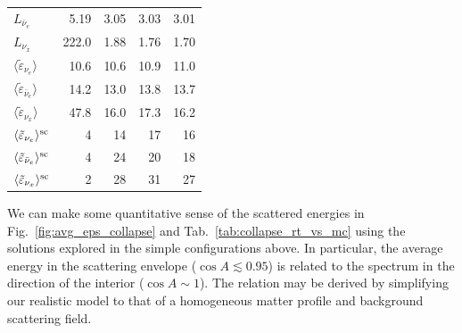 \documentclass[aps,floatfix,prd,superscriptaddress,twocolumn]{revtex4-1}
\begin{document}
\begin{table}
\begin{tabularx}{\columnwidth}{X r r r r}
    $L_{\bar{\nu}_e}$                                   & 5.19 & 3.05 & 3.03 & 3.01 \\
    $L_{\nu_x}$                                         & 222.0  & 1.88 & 1.76 & 1.70 \\
    $\langle \tilde{\varepsilon}_{\nu_e} \rangle$               &  10.6 & 10.6 & 10.9 & 11.0 \\
    $\langle \tilde{\varepsilon}_{\bar{\nu}_e} \rangle$         & 14.2 & 13.0 & 13.8 & 13.7 \\
    $\langle \tilde{\varepsilon}_{\nu_x} \rangle$               & 47.8 & 16.0 & 17.3 & 16.2 \\
    $\langle \tilde{\varepsilon}_{\nu_e} \rangle^{\rm sc}$      & 4    & 14   & 17   & 16 \\
    $\langle \tilde{\varepsilon}_{\bar{\nu}_e} \rangle^{\rm sc}$& 4    & 24   & 20   & 18 \\
    $\langle \tilde{\varepsilon}_{\nu_x} \rangle^{\rm sc}$      & 2    & 28   & 31   & 27 \\
    \hline
  \end{tabularx}
\end{table}

We can make some quantitative sense of the scattered energies in
Fig.~\ref{fig:avg_eps_collapse} and Tab.~\ref{tab:collapse_rt_vs_mc}
using the solutions explored in the simple configurations above.
In particular, the average energy in the scattering envelope
($\cos A\lesssim 0.95$) is related to the spectrum in the direction
of the interior ($\cos A \sim 1$).
The relation may be derived by simplifying our realistic model
to that of a homogeneous matter profile and background scattering field.
\end{document}
